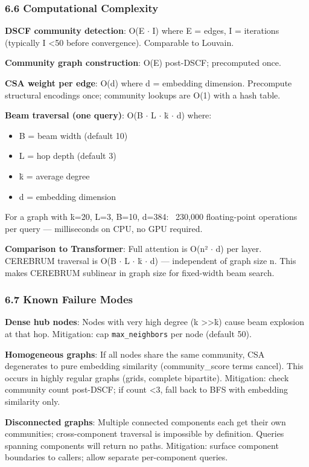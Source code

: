 \documentclass[10pt,journal,compsoc]{IEEEtran}
\begin{document}
\subsubsection{6.6 Comput\-ational Complexity}

\textbf{DSCF community detection}: O(E $\cdot$ I) where E = edges, I = iterations
(typically I \textless  50 before convergence). Comparable to Louvain.

\textbf{Community graph const\-ruction}: O(E) post-DSCF; precomputed once.

\textbf{CSA weight per edge}: O(d) where d = embedding dimension. Precompute
structural encodings once; community lookups are O(1) with a hash table.

\textbf{Beam traversal (one query)}: O(B $\cdot$ L $\cdot$ k̄ $\cdot$ d) where:
\begin{itemize}
\item B = beam width (default 10)
\item L = hop depth (default 3)
\item k̄ = average degree
\item d = embedding dimension

\end{itemize}
For a graph with k̄=20, L=3, B=10, d=384: ~230,000 floating-point operations
per query — milli\-seconds on CPU, no GPU required.

\textbf{Comparison to Transformer}: Full attention is O(n² $\cdot$ d) per layer.
CEREBRUM traversal is O(B $\cdot$ L $\cdot$ k̄ $\cdot$ d) — independent of graph size n.
This makes CEREBRUM sublinear in graph size for fixed-width beam search.

\subsubsection{6.7 Known Failure Modes}

\textbf{Dense hub nodes}: Nodes with very high degree (k \textgreater \textgreater  k̄) cause beam
explosion at that hop. Mitigation: cap \texttt{max\_neighbors} per node (default 50).

\textbf{Homogeneous graphs}: If all nodes share the same community, CSA degenerates
to pure embedding similarity (community\_score terms cancel). This occurs in
highly regular graphs (grids, complete bipartite). Mitigation: check community
count post-DSCF; if count \textless  3, fall back to BFS with embedding similarity only.

\textbf{Discon\-nected graphs}: Multiple connected components each get their own
communities; cross-component traversal is impossible by definition. Queries
spanning components will return no paths. Mitigation: surface component
boundaries to callers; allow separate per-component queries.
\end{document}
